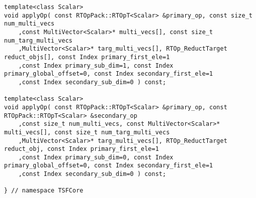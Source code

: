 {\begin{verbatim}
template<class Scalar>
void applyOp( const RTOpPack::RTOpT<Scalar> &primary_op, const size_t num_multi_vecs
    ,const MultiVector<Scalar>* multi_vecs[], const size_t num_targ_multi_vecs
    ,MultiVector<Scalar>* targ_multi_vecs[], RTOp_ReductTarget reduct_objs[], const Index primary_first_ele=1
    ,const Index primary_sub_dim=1, const Index primary_global_offset=0, const Index secondary_first_ele=1
    ,const Index secondary_sub_dim=0 ) const;

template<class Scalar>
void applyOp( const RTOpPack::RTOpT<Scalar> &primary_op, const RTOpPack::RTOpT<Scalar> &secondary_op
    ,const size_t num_multi_vecs, const MultiVector<Scalar>* multi_vecs[], const size_t num_targ_multi_vecs
    ,MultiVector<Scalar>* targ_multi_vecs[], RTOp_ReductTarget reduct_obj, const Index primary_first_ele=1
    ,const Index primary_sub_dim=0, const Index primary_global_offset=0, const Index secondary_first_ele=1
    ,const Index secondary_sub_dim=0 ) const;

} // namespace TSFCore
\end{verbatim}}
